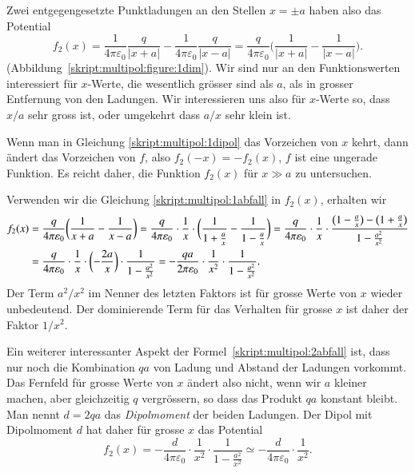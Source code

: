 Zwei entgegengesetzte Punktladungen an den Stellen $x=\pm a$ haben also
das Potential
\begin{equation}
f_2(x)
=
\frac1{4\pi\varepsilon_0}\frac{q}{|x+a|}
-
\frac1{4\pi\varepsilon_0}\frac{q}{|x-a|}
=
\frac{q}{4\pi\varepsilon_0}\biggl( \frac1{|x+a|} - \frac1{|x-a|} \biggr).
\label{skript:multipol:1dipol}
\end{equation}
(Abbildung~\ref{skript:multipol:figure:1dim}).
Wir sind nur an den Funktionswerten interessiert für $x$-Werte, die
wesentlich grösser sind als $a$, als in grosser Entfernung von
den Ladungen.
Wir interessieren uns also für $x$-Werte so, dass $x/a$ sehr gross ist,
oder umgekehrt dass $a/x$ sehr klein ist.

Wenn man in Gleichung \eqref{skript:multipol:1dipol} das Vorzeichen
von $x$ kehrt, dann ändert das Vorzeichen von $f$, also $f_2(-x)=-f_2(x)$,
$f$ ist eine ungerade Funktion.
Es reicht daher, die Funktion $f_2(x)$ für $x\gg a$ zu untersuchen.

Verwenden wir die Gleichung \eqref{skript:multipol:1abfall} in $f_2(x)$,
erhalten wir
\begin{align}
f_2(x)
&=
\frac{q}{4\pi\varepsilon_0}\biggl(\frac1{x+a}-\frac1{x-a}\biggr)
=
\frac{q}{4\pi\varepsilon_0}\cdot\frac1x\cdot\biggl(
\frac1{1+\frac{a\mathstrut}{x}}
-
\frac1{1-\frac{a\mathstrut}{x}}
\biggr)
=
\frac{q}{4\pi\varepsilon_0}\cdot\frac1x\cdot
\frac{\bigl(1-\frac{a}{x}\bigr)-\bigl(1+\frac{a}{x}\bigr)}{1-\frac{a^2}{x^2}}
\notag
\\
&=
\frac{q}{4\pi\varepsilon_0}\cdot\frac1x\cdot
\biggl(-\frac{2a}{x}\biggr)
\cdot
\frac1{1-\frac{a^2}{x^2}}
=
-\frac{qa}{2\pi\varepsilon_0}\cdot\frac1{x^2}\cdot\frac{1}{1-\frac{a^2}{x^2}}.
\label{skript:multipol:2abfall}
\end{align}
Der Term $a^2/x^2$ im Nenner des letzten Faktors ist für grosse Werte von
$x$ wieder unbedeutend.
Der dominierende Term für das Verhalten für grosse $x$ ist daher der
Faktor $1/x^2$.

Ein weiterer interessanter Aspekt der Formel~\eqref{skript:multipol:2abfall}
ist, dass nur noch die Kombination $qa$ von Ladung und Abstand der Ladungen
vorkommt.
Das Fernfeld für grosse Werte von $x$ ändert also nicht, wenn wir $a$
kleiner machen, aber gleichzeitig $q$ vergrössern, so dass das Produkt
$qa$ konstant bleibt.
Man nennt $d=2qa$ das {\em Dipolmoment} der beiden Ladungen.
%
Der Dipol mit Dipolmoment $d$ hat daher für grosse $x$ das Potential
\[
f_2(x)
=
-\frac{d}{4\pi\varepsilon_0}\cdot \frac1{x^2}\cdot \frac1{1-\frac{a^2}{x^2}}
\simeq
-\frac{d}{4\pi\varepsilon_0}\cdot \frac1{x^2}.
\]


